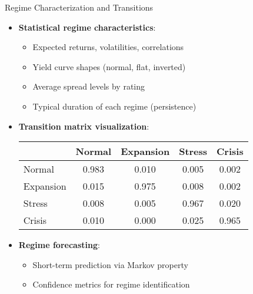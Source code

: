 \documentclass{beamer}
\begin{document}
\begin{frame}{Regime Characterization and Transitions}
\begin{itemize}
    \item \textbf{Statistical regime characteristics}:
    \begin{itemize}
        \item Expected returns, volatilities, correlations
        \item Yield curve shapes (normal, flat, inverted)
        \item Average spread levels by rating
        \item Typical duration of each regime (persistence)
    \end{itemize}
    \item \textbf{Transition matrix visualization}:
    
    \begin{center}
    \scriptsize
    \begin{tabular}{l|cccc}
    \toprule
    & Normal & Expansion & Stress & Crisis \\
    \midrule
    Normal & 0.983 & 0.010 & 0.005 & 0.002 \\
    Expansion & 0.015 & 0.975 & 0.008 & 0.002 \\
    Stress & 0.008 & 0.005 & 0.967 & 0.020 \\
    Crisis & 0.010 & 0.000 & 0.025 & 0.965 \\
    \bottomrule
    \end{tabular}
    \end{center}
    
    \item \textbf{Regime forecasting}:
    \begin{itemize}
        \item Short-term prediction via Markov property
        \item Confidence metrics for regime identification
    \end{itemize}
\end{itemize}
\end{frame}
\end{document}
